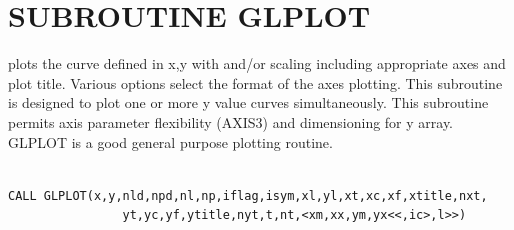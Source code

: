 \documentclass[11pt]{report}
\begin{document}
\newpage
\section{SUBROUTINE GLPLOT}

 plots the curve defined in x,y with  and/or  scaling
including appropriate axes and plot title.  Various options select the
format of the axes plotting. This subroutine is designed to plot one
or more 
y value curves simultaneously.  This subroutine permits axis parameter
flexibility (AXIS3) and dimensioning for y array.  GLPLOT is a good
general purpose plotting routine.
\begin{verbatim}

CALL GLPLOT(x,y,nld,npd,nl,np,iflag,isym,xl,yl,xt,xc,xf,xtitle,nxt,
                yt,yc,yf,ytitle,nyt,t,nt,<xm,xx,ym,yx<<,ic>,l>>)


\end{verbatim}
\end{document}

